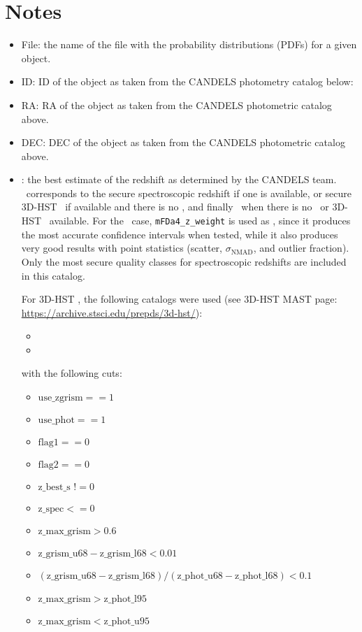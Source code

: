 \section*{Notes}
\begin{itemize}

\item File: the name of the file with the probability distributions (PDFs) for a given object.

\item ID: ID of the object as taken from the CANDELS photometry catalog below:\\
	\photomcat

\item RA: RA of the object as taken from the CANDELS photometric catalog above.

\item DEC: DEC of the object as taken from the CANDELS photometric catalog above.

\item \zbest: the best estimate of the redshift as determined by the CANDELS team.  \zbest\ corresponds to the secure spectroscopic redshift if one is available, or secure 3D-HST \grismz\ if available and there is no \specz, and finally \photoz\ when there is no \specz\ or 3D-HST \grismz\ available. For the \photoz\ case, \texttt{mFDa4\_z\_weight} is used as \zbest, since it produces the most accurate confidence intervals when tested, while it also produces very good results with point statistics (scatter, $\sigma_\mathrm{NMAD}$, and outlier fraction). Only the most secure quality classes for spectroscopic redshifts are included in this catalog.

For 3D-HST \grismzs, the following catalogs were used (see 3D-HST MAST page: \href{https://archive.stsci.edu/prepds/3d-hst/}{https://archive.stsci.edu/prepds/3d-hst/}):
\begin{itemize}
\item \grismzfit
\item \grismcat
\end{itemize}

with the following cuts:
\begin{itemize}
\item $\mathrm{use\_zgrism} == 1$
\item $\mathrm{use\_phot} == 1$
\item $\mathrm{flag1} == 0$
\item $\mathrm{flag2} == 0$
\item $\mathrm{z\_best\_s} \, \, !\!= 0$
\item $\mathrm{z\_spec} <= 0$
\item $\mathrm{z\_max\_grism} > 0.6$
\item $\mathrm{z\_grism\_u68} - \mathrm{z\_grism\_l68} < 0.01$
\item $(\mathrm{z\_grism\_u68} - \mathrm{z\_grism\_l68}) / (\mathrm{z\_phot\_u68} - \mathrm{z\_phot\_l68}) < 0.1$
\item $\mathrm{z\_max\_grism} > \mathrm{z\_phot\_l95}$
\item $\mathrm{z\_max\_grism} < \mathrm{z\_phot\_u95}$
\end{itemize}


\end{itemize}
